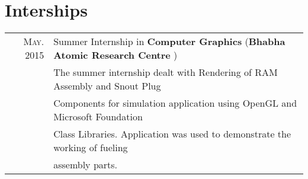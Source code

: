 \documentclass[a4paper,10pt]{article}
\begin{document}
\section{Interships}
\begin{tabular}{rl}
 \textsc{May.} 2015 & Summer Internship in \large\textbf{Computer Graphics} (\normalsize\textbf{Bhabha Atomic Research Centre })\normalsize\\ & The summer internship dealt with Rendering of RAM Assembly and Snout Plug \\ & Components for simulation application using OpenGL and Microsoft Foundation\\ & Class Libraries. Application was used to demonstrate the working of fueling \\& assembly parts. \\ 
 
\end{tabular}


\end{document}
